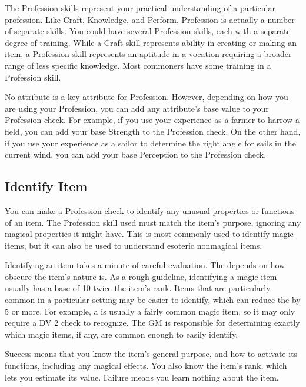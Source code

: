 \newpage
{}
    The Profession skills represent your practical understanding of a particular profession.
        Like Craft, Knowledge, and Perform, Profession is actually a number of separate skills.
        You could have several Profession skills, each with a separate degree of training.
        While a Craft skill represents ability in creating or making an item, a Profession skill represents an aptitude in a vocation requiring a broader range of less specific knowledge.
        Most commoners have some training in a Profession skill.

        No attribute is a key attribute for Profession.
        However, depending on how you are using your Profession, you can add any attribute's base value to your Profession check.
        For example, if you use your experience as a farmer to harrow a field, you can add your base Strength to the Profession check.
        On the other hand, if you use your experience as a sailor to determine the right angle for sails in the current wind, you can add your base Perception to the Profession check.

    \subsection{Identify Item}
        You can make a Profession check to identify any unusual properties or functions of an item.
        The Profession skill used must match the item's purpose, ignoring any magical properties it might have.
        This is most commonly used to identify magic items, but it can also be used to understand esoteric nonmagical items.

        Identifying an item takes a minute of careful evaluation.
        The  depends on how obscure the item's nature is.
        As a rough guideline, identifying a magic item usually has a base  of 10 \add twice the item's rank.
        Items that are particularly common in a particular setting may be easier to identify, which can reduce the  by 5 or more.
        For example, a  is usually a fairly common magic item, so it may only require a DV 2 check to recognize.
        The GM is responsible for determining exactly which magic items, if any, are common enough to easily identify.

        Success means that you know the item's general purpose, and how to activate its functions, including any magical effects.
        You also know the item's rank, which lets you estimate its value.
        Failure means you learn nothing about the item.

